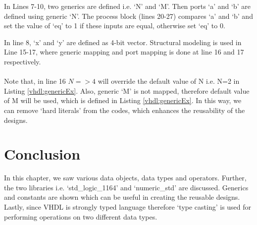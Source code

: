 \begin{explanation}
	In Lines 7-10, two generics are defined i.e. `N' and `M'. Then ports `a' and `b' are defined using generic `N'. The process block (lines 20-27) compares `a' and `b' and set the value of `eq' to 1 if these inputs are equal, otherwise set `eq' to 0. 
\end{explanation}


\begin{explanation}
	In line 8, `x' and `y' are defined as 4-bit vector. Structural modeling is used in Line 15-17, where generic mapping and port mapping is done at line 16 and 17 respectively. 
	\\ \\
	Note that, in line 16 $N=>4$ will override the default value of N i.e. N=2 in Listing \ref{vhdl:genericEx}. Also, generic `M' is not mapped, therefore default value of M will be used, which is defined in Listing \ref{vhdl:genericEx}. In this way, we can remove `hard literals' from the codes, which enhances the reusability of the designs. 
\end{explanation}


\section{Conclusion}
In this chapter, we saw various data objects, data types and operators. Further, the two libraries i.e. `std\_logic\_1164' and `numeric\_std' are discussed. Generics and constants are shown which can be useful in creating the reusable designs. Lastly, since VHDL is strongly typed language therefore `type casting' is used for performing operations on two different data types. 